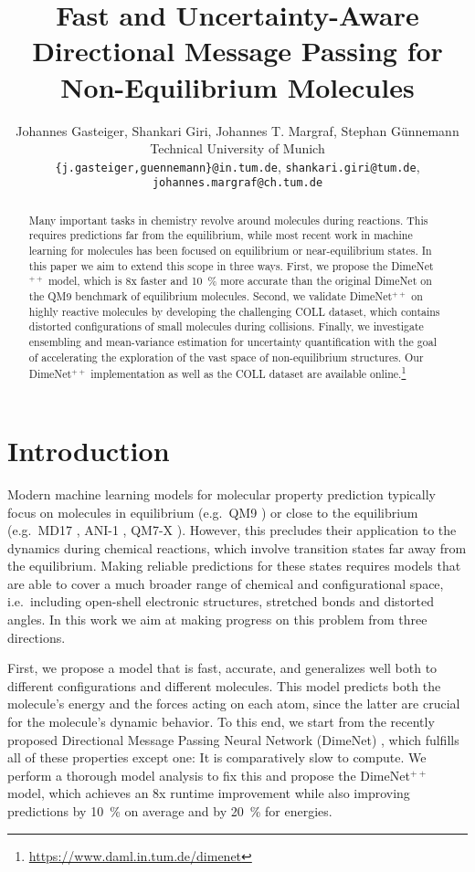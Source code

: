 \documentclass{article}
\title{Fast and Uncertainty-Aware Directional Message Passing for Non-Equilibrium Molecules}
\author{Johannes Gasteiger, Shankari Giri, Johannes T. Margraf, Stephan Günnemann\\
  Technical University of Munich\\
  \texttt{\{j.gasteiger,guennemann\}@in.tum.de}, \texttt{shankari.giri@tum.de},\\ \texttt{johannes.margraf@ch.tum.de}\\
}
\begin{document}
\maketitle

\begin{abstract}
Many important tasks in chemistry revolve around molecules during reactions. This requires predictions far from the equilibrium, while most recent work in machine learning for molecules has been focused on equilibrium or near-equilibrium states. In this paper we aim to extend this scope in three ways. First, we propose the DimeNet$^{++}$ model, which is 8x faster and \SI{10}{\percent} more accurate than the original DimeNet on the QM9 benchmark of equilibrium molecules. Second, we validate DimeNet$^{++}$ on highly reactive molecules by developing the challenging \textsc{COLL} dataset, which contains distorted configurations of small molecules during collisions. Finally, we investigate ensembling and mean-variance estimation for uncertainty quantification with the goal of accelerating the exploration of the vast space of non-equilibrium structures. Our DimeNet$^{++}$ implementation as well as the \textsc{COLL} dataset are available online.\footnote{\url{https://www.daml.in.tum.de/dimenet}}
\end{abstract}

\section{Introduction} \label{sec:intro}

Modern machine learning models for molecular property prediction typically focus on molecules in equilibrium (e.g.\ QM9 \cite{ramakrishnan_quantum_2014}) or close to the equilibrium (e.g.\ MD17 \cite{chmiela_machine_2017}, ANI-1 \cite{smith_ani-1_2017}, QM7-X \cite{hoja_qm7-x_2020}). However, this precludes their application to the dynamics during chemical reactions, which involve transition states far away from the equilibrium. Making reliable predictions for these states requires models that are able to cover a much broader range of chemical and configurational space, i.e.\ including open-shell electronic structures, stretched bonds and distorted angles. In this work we aim at making progress on this problem from three directions.

First, we propose a model that is fast, accurate, and generalizes well both to different configurations and different molecules. This model predicts both the molecule's energy and the forces acting on each atom, since the latter are crucial for the molecule's dynamic behavior. To this end, we start from the recently proposed Directional Message Passing Neural Network (DimeNet) \cite{gasteiger_directional_2020}, which fulfills all of these properties except one: It is comparatively slow to compute. We perform a thorough model analysis to fix this and propose the DimeNet$^{++}$ model, which achieves an 8x runtime improvement while also improving predictions by \SI{10}{\percent} on average and by \SI{20}{\percent} for energies.
\end{document}
